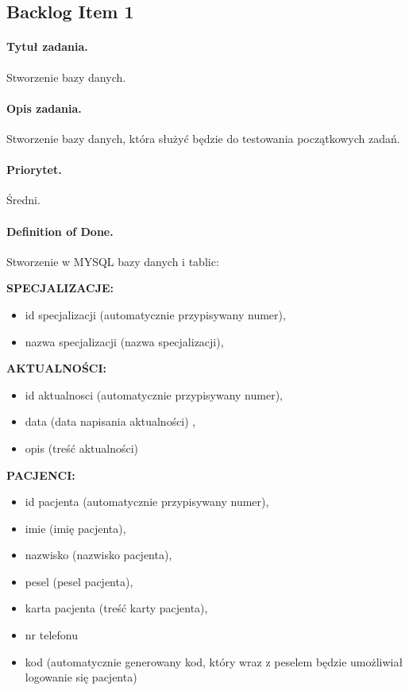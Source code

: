 \documentclass[a4paper]{article} \usepackage{polski} \usepackage[cp1250]{inputenc} \usepackage{url}
\begin{document}
\subsection{Backlog Item 1} \paragraph{Tytuł zadania.} Stworzenie  bazy danych. \paragraph{Opis zadania.} Stworzenie bazy danych, która służyć będzie do testowania początkowych zadań. \paragraph{Priorytet.} Średni. \paragraph{Definition of Done.} Stworzenie w MYSQL bazy danych i tablic: 
\newline

 \textbf{SPECJALIZACJE: }

\begin{itemize}
\item id specjalizacji (automatycznie przypisywany numer),
\item nazwa specjalizacji (nazwa specjalizacji), 
\end{itemize}


 \textbf{AKTUALNOŚCI: }

\begin{itemize}
\item id aktualnosci (automatycznie przypisywany numer),
\item data (data napisania aktualności) , 
\item opis (treść aktualności)
\end{itemize}

\textbf{PACJENCI: }
  
\begin{itemize}
\item id pacjenta (automatycznie przypisywany numer), 
\item imie (imię pacjenta), 
\item nazwisko (nazwisko pacjenta), 
\item pesel (pesel pacjenta), 
\item karta pacjenta (treść karty pacjenta), 
\item nr telefonu
\item kod (automatycznie generowany kod, który wraz z peselem będzie umożliwiał logowanie się pacjenta)
\end {itemize}\newline
\end{document}
